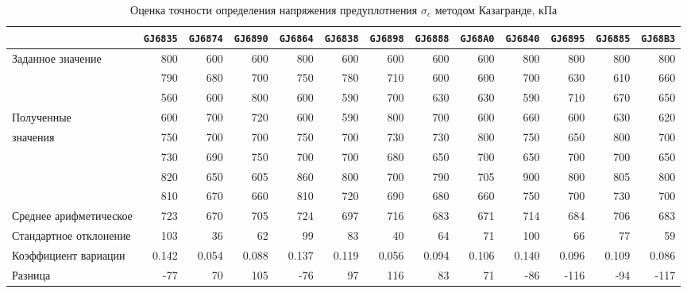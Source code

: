\begin{sidewaystable}[p]
    \centering
    \small
    \caption{Оценка точности определения напряжения предуплотнения $\sigma_c$ методом Казагранде, кПа} \label{tab:accuracy-caz}
    \begin{tabular}{@{}lrrrrrrrrrrrr@{}}
    \toprule
     & \texttt{GJ6835} & \texttt{GJ6874} & \texttt{GJ6890} & \texttt{GJ6864} & \texttt{GJ6838} & \texttt{GJ6898} & \texttt{GJ6888} & \texttt{GJ68A0} & \texttt{GJ6840} & \texttt{GJ6895} & \texttt{GJ6885} & \texttt{GJ68B3} \\
    \midrule
    Заданное значение & 800 & 600 & 600 & 800 & 600 & 600 & 600 & 600 & 800 & 800 & 800 & 800 \\
    \midrule
     & 790 & 680 & 700 & 750 & 780 & 710 & 600 & 600 & 700 & 630 & 610 & 660 \\
     & 560 & 600 & 800 & 600 & 590 & 700 & 630 & 630 & 590 & 710 & 670 & 650 \\
    Полученные & 600 & 700 & 720 & 600 & 590 & 800 & 700 & 600 & 660 & 600 & 630 & 620 \\
    значения & 750 & 700 & 700 & 750 & 700 & 730 & 730 & 800 & 750 & 650 & 800 & 700 \\
     & 730 & 690 & 750 & 700 & 700 & 680 & 650 & 700 & 650 & 700 & 700 & 650 \\
     & 820 & 650 & 605 & 860 & 800 & 700 & 790 & 705 & 900 & 800 & 805 & 800 \\
     & 810 & 670 & 660 & 810 & 720 & 690 & 680 & 660 & 750 & 700 & 730 & 700 \\
    \midrule
    Среднее арифметическое & 723 & 670 & 705 & 724 & 697 & 716 & 683 & 671 & 714 & 684 & 706 & 683 \\
    Стандартное отклонение & 103 & 36 & 62 & 99 & 83 & 40 & 64 & 71 & 100 & 66 & 77 & 59 \\
    Коэффициент вариации & 0.142 & 0.054 & 0.088 & 0.137 & 0.119 & 0.056 & 0.094 & 0.106 & 0.140 & 0.096 & 0.109 & 0.086 \\
    \midrule
    Разница & -77 & 70 & 105 & -76 & 97 & 116 & 83 & 71 & -86 & -116 & -94 & -117 \\
    \bottomrule
    \end{tabular}
    \\ 
\end{sidewaystable}


